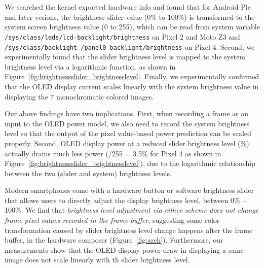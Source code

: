 We searched the kernel exported hardware info 
and  found that for Android Pie and later vesions, %
the brightness slider value (0\% to 100\%) is 
transformed to the system screen brightness value (0 to 255),
which can be read from system variable {\small \tt
  /sys/class/leds/lcd-backlight/brightness} on Pixel 2 and Moto Z3
and {{\small \tt /sys/class/backlight
    /panel0-backlight/brightness} on Pixel 4}.  
Second, we experimentally 
found that the slider brightness level is mapped 
to the system brightness level via a logarithmic function.
as shown in Figure~\ref{fig:brightnessslider_brightnesslevel}.
Finally, we experimentally confirmed that the OLED display current
scales linearly with the system brightness value in displaying the 7
monochromatic colored images.


Our above findings have two implications.
First, when recording a frame as an input to the OLED power model,
we also need to record the system brightness level so that
the output of the pixel value-based power prediction
can be scaled properly.
Second, OLED display power at a reduced slider brightness level (\%)
actually drains much less power (/255 = 3.5\% for Pixel 4 as shown in Figure~\ref{fig:brightnessslider_brightnesslevel}), due to the logarithmic relationship
between the two (slider and system) brightness levels.


Modern smartphones come with a hardware button or software brightness
slider that allows users to directly adjust the display brightness
level, \eg between 0\% -- 100\%.  We find that {\em brightness level
  adjustment via either scheme does not change frame pixel values
  recorded in the frame buffer}, suggesting some color transformation
caused by slider brightness level change happens after the frame
buffer, \ie in the hardware composer (Figure~\ref{fig:arch}). 
Furthermore, our measurements show that 
the OLED display power draw in displaying a same image
does not scale linearly with th slider brightness level.

